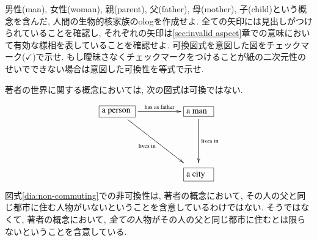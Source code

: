 \begin{exercise}\label{exc:family olog}


男性(man), 女性(woman), 親(parent), 父(father), 母(mother), 子(child)という概念を含んだ, 人間の生物的核家族のologを作成せよ. 全ての矢印には見出しがつけられていることを確認し, それぞれの矢印は\ref{sec:invalid aspect}章での意味において有効な様相を表していることを確認せよ. 可換図式を意図した図をチェックマーク($\checkmark$)で示せ. もし曖昧さなくチェックマークをつけることが紙の二次元性のせいでできない場合は意図した可換性を等式で示せ.
\end{exercise}

\begin{example}


著者の世界に関する概念においては, 次の図式は可換ではない.
\begin{align}\label{dia:non-commuting}
\xymatrixnocompile@=50pt{\obox{}{.5in}{a person}\LA{r}{has as father}\LAL{dr}{lives in}&\obox{}{.4in}{a man}\LA{d}{lives in}\\&\obox{}{.4in}{a city}}
\end{align}
図式\eqref{dia:non-commuting}での非可換性は, 著者の概念において, その人の父と同じ都市に住む人物がいないということを含意しているわけではない. そうではなくて, 著者の概念において, \emph{全ての}人物がその人の父と同じ都市に住むとは限らないということを含意している.

\end{example}

